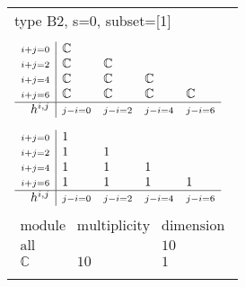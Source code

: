 \documentclass[crop,border=2mm]{standalone}
\begin{document}
\begin{tabular}{l}
{\huge type B2, s=0, subset=[1]}\\ \\


$\displaystyle
\begin{array}{r|l l l l}
	{\scriptstyle i+j=0}&\mathbb{C}&&&\\
	{\scriptstyle i+j=2}&\mathbb{C}&\mathbb{C}&&\\
	{\scriptstyle i+j=4}&\mathbb{C}&\mathbb{C}&\mathbb{C}&\\
	{\scriptstyle i+j=6}&\mathbb{C}&\mathbb{C}&\mathbb{C}&\mathbb{C}\\
	\hline h^{i,j}&{\scriptstyle j-i=0}&{\scriptstyle j-i=2}&{\scriptstyle j-i=4}&{\scriptstyle j-i=6}
\end{array}
$ \\ \\


$\displaystyle
\begin{array}{r|l l l l}
	{\scriptstyle i+j=0}&1&&&\\
	{\scriptstyle i+j=2}&1&1&&\\
	{\scriptstyle i+j=4}&1&1&1&\\
	{\scriptstyle i+j=6}&1&1&1&1\\
	\hline h^{i,j}&{\scriptstyle j-i=0}&{\scriptstyle j-i=2}&{\scriptstyle j-i=4}&{\scriptstyle j-i=6}
\end{array}
$ \\ \\


$\displaystyle
\begin{array}{rll}
	\text{module}&\text{multiplicity}&\text{dimension} \\ \hline \text{all}&&10 \\
	\mathbb{C}&10&1
\end{array}
$ \\ \\

\end{tabular}
\end{document}

